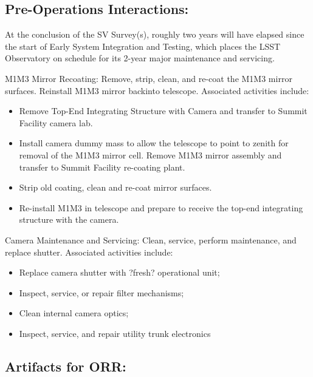 \subsection{Pre-Operations Interactions:}

At the conclusion of the SV Survey(s), roughly two years will have elapsed since the start of Early System Integration and Testing, which places the LSST Observatory on schedule for its 2-year major maintenance and servicing.

M1M3 Mirror Recoating: Remove, strip, clean, and re-coat the M1M3 mirror surfaces. Reinstall M1M3 mirror backinto telescope. Associated activities include:

\begin{itemize}
\item Remove Top-End Integrating Structure with Camera and transfer to Summit Facility camera lab.
\item Install camera dummy mass to allow the telescope to point to zenith for removal of the M1M3 mirror cell. Remove M1M3 mirror assembly and transfer to Summit Facility re-coating plant.
\item Strip old coating, clean and re-coat mirror surfaces.
\item Re-install M1M3 in telescope and prepare to receive the top-end integrating structure with the camera.
\end{itemize}

Camera Maintenance and Servicing: Clean, service, perform maintenance, and replace shutter. Associated activities include:

\begin{itemize}
\item Replace camera shutter with ?fresh? operational unit;
\item Inspect, service, or repair filter mechanisms;
\item Clean internal camera optics;
\item Inspect, service, and repair utility trunk electronics
\end{itemize}

\subsection{Artifacts for ORR:}

